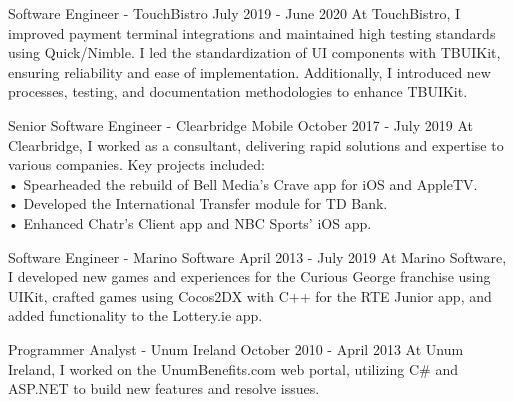\documentclass[
	10pt, %
]{FreemanCV}
\begin{document}
\begin{paracol}{2}

\jobentry
	{Software Engineer - TouchBistro}
    {July 2019 - June 2020}
    {At TouchBistro, I improved payment terminal integrations and maintained high testing standards using Quick/Nimble. I led the standardization of UI components with TBUIKit, ensuring reliability and ease of implementation. Additionally, I introduced new processes, testing, and documentation methodologies to enhance TBUIKit.}


\jobentry
    {Senior Software Engineer - Clearbridge Mobile}
    {October 2017 - July 2019}
    {At Clearbridge, I worked as a consultant, delivering rapid solutions and expertise to various companies. Key projects included:\medskip\\
    • Spearheaded the rebuild of Bell Media’s Crave app for iOS and AppleTV.\\
    • Developed the International Transfer module for TD Bank.\\
    • Enhanced Chatr’s Client app and NBC Sports’ iOS app.}


\jobentry
    {Software Engineer - Marino Software}
    {April 2013 - July 2019}
    {At Marino Software, I developed new games and experiences for the Curious George franchise using UIKit, crafted games using Cocos2DX with C++ for the RTE Junior app, and added functionality to the Lottery.ie app.}


\jobentry
    {Programmer Analyst - Unum Ireland}
    {October 2010 - April 2013}
    {At Unum Ireland, I worked on the UnumBenefits.com web portal, utilizing C\# and ASP.NET to build new features and resolve issues.}
    

\switchcolumn %


\end{paracol}
\end{document}
